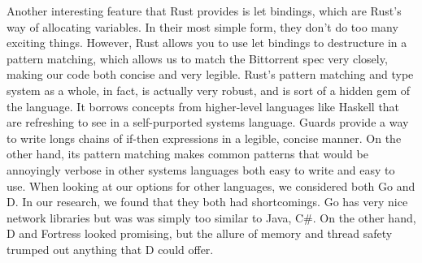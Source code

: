 \documentclass{acm_proc_article-sp}
\begin{document}
Another interesting feature that Rust provides is let bindings, which are Rust's way of allocating variables. In their most simple form, they don't do too many exciting things. However, Rust allows you to use let bindings to destructure in a pattern matching, which allows us to match the Bittorrent spec very closely, making our code both concise and very legible. Rust's pattern matching and type system as a whole, in fact, is actually very robust, and is sort of a hidden gem of the language. It borrows concepts from higher-level languages like Haskell that are refreshing to see in a self-purported systems language. Guards provide a way to write longs chains of if-then expressions in a legible, concise manner. On the other hand, its pattern matching makes common patterns that would be annoyingly verbose in other systems languages both easy to write and easy to use.
When looking at our options for other languages, we considered both Go and D. In our research, we found that they both had shortcomings. Go has very nice network libraries but was was simply too similar to Java, C\#. On the other hand, D and Fortress looked promising, but the allure of memory and thread safety trumped out anything that D could offer.
\end{document}
